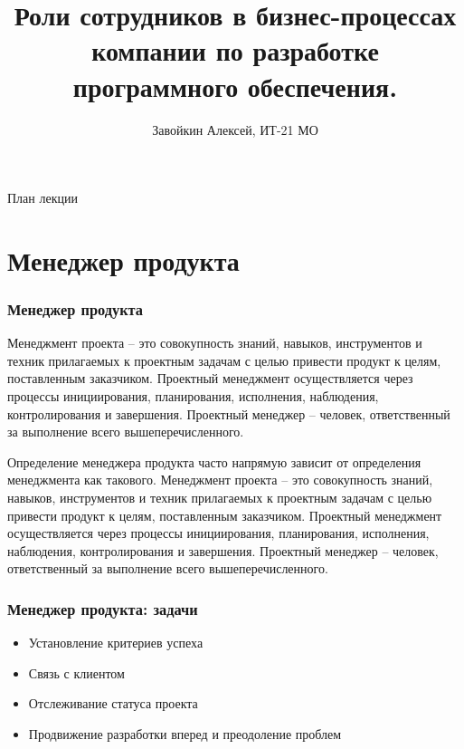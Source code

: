 \documentclass{../industrial-development}
\title{Роли сотрудников в бизнес-процессах компании по разработке программного обеспечения.}
\author{Завойкин Алексей, ИТ-21 МО}
\date{}
\begin{document}
\begin{frame}
  \titlepage
\end{frame}

\begin{frame}{План лекции}
  \tableofcontents
\end{frame}

\section{Менеджер продукта }

\begin{frame} \frametitle{Менеджер продукта}
	\begin{block}{}
	\alert {}Менеджмент проекта – это совокупность знаний, навыков, инструментов и техник прилагаемых к проектным задачам с целью привести продукт к целям, поставленным заказчиком. Проектный менеджмент осуществляется через процессы инициирования, планирования, исполнения, наблюдения, контролирования и завершения. Проектный менеджер – человек, ответственный за выполнение всего вышеперечисленного. 
\end{block}
  
\end{frame}

\lecturenotes

Определение менеджера продукта часто напрямую зависит от определения менеджмента как такового. Менеджмент проекта – это совокупность знаний, навыков, инструментов и техник прилагаемых к проектным задачам с целью привести продукт к целям, поставленным заказчиком. Проектный менеджмент осуществляется через процессы инициирования, планирования, исполнения, наблюдения, контролирования и завершения. Проектный менеджер – человек, ответственный за выполнение всего вышеперечисленного. 
  ~\cite{Anatomy}
  
\begin{frame} \frametitle{Менеджер продукта: задачи}
  \begin{itemize}
  \item Установление критериев успеха
  \item Связь с клиентом
  \item Отслеживание статуса проекта
  \item Продвижение разработки вперед и преодоление проблем 
  \end{itemize}
\end{frame}

\lecturenotes
\end{document}
